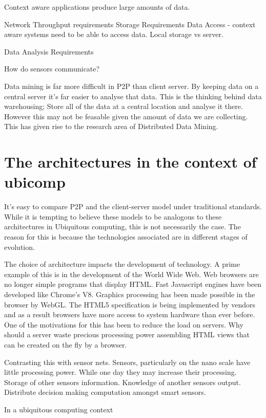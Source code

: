 \documentclass[11pt]{amsart}
\begin{document}
Context aware applications produce large amounts of data.

Network
Throughput requirements
Storage Requirements
Data Access - context aware systems need to be able to access data. Local storage vs server.

Data Analysis Requirements

How do sensors communicate?

Data mining is far more difficult in P2P than client server. By keeping data on a central server it's far easier to analyse that data. This is the thinking behind data warehousing; Store all of the data at a central location and analyse it there. However this may not be feasable given the amount of data we are collecting. This has given rise to the research area of Distributed Data Mining.

\part{The architectures in the context of ubicomp}

It's easy to compare P2P and the client-server model under traditional standards. While it is tempting to believe these models to be analogous to these architectures in Ubiquitous computing, this is not necessarily the case. The reason for this is because the technologies associated are in different stages of evolution.

The choice of architecture impacts the development of technology. A prime example of this is in the development of the World Wide Web. Web browsers are no longer simple programs that display HTML. Fast Javascript engines have been developed like Chrome's V8. Graphics processing has been made possible in the browser by WebGL. The HTML5 specification is being implemented by vendors and as a result browsers have more access to system hardware than ever before. One of the motivations for this has been to reduce the load on servers. Why should a server waste precious processing power assembling HTML views that can be created on the fly by a browser.

Contrasting this with sensor nets. Sensors, particularly on the nano scale have little processing power. While one day they may increase their processing. Storage of other sensors information.
Knowledge of another sensors output.
Distribute decision making computation amongst smart sensors.

In a ubiquitous computing context 
\end{document}

